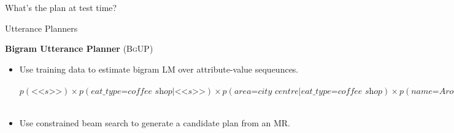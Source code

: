 \begin{frame}{What's the plan at test time?}
{
}
\end{frame}

\begin{frame}{Utterance Planners}

\textbf{Bigram Utterance Planner} (\textsc{BgUP})\\
\begin{itemize}
\item Use training data to estimate bigram LM over attribute-value sequeunces.\\
~\\
$p(\textit{<<s>>})\times p(\textit{eat\_type=coffee shop}|\textit{<<s>>})\times p(\textit{area=city centre}|\textit{eat\_type=coffee shop})
\times p(\textit{name=Aromi}|\textit{area=city centre})\times
p(\textit{<<e>>}|\textit{name=Aromi})$\\~\\

\item Use constrained beam search to generate a candidate plan from an MR.
\end{itemize}
\end{frame}


